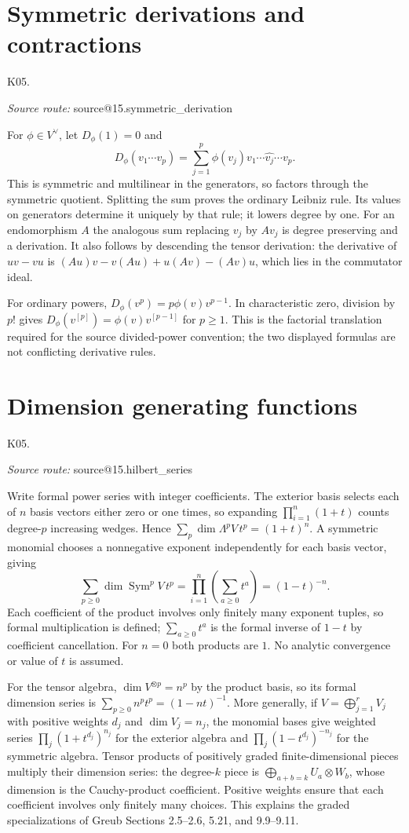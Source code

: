\documentclass[11pt,a4paper]{book}
\makeatletter
\theoremstyle{definition}\newtheorem{definition}[theorem]{Definition}
\theoremstyle{remark}\newtheorem{remark}[theorem]{Remark}
\DeclareMathOperator{\Sym}{Sym}\DeclareMathOperator{\Ann}{Ann}
\newcommand{\Kentry}[2]{\section{#2}\label{k:#1}\noindent\textsf{\small K05.\detokenize{#1}}\par
  \begingroup\small\color{black!65}\textit{Source route: }\csname source@#1\endcsname\par\endgroup}
\makeatother
\begin{document}
\Kentry{15.symmetric_derivation}{Symmetric derivations and contractions}
For $\phi\in V^\vee$, let $D_\phi(1)=0$ and
\[
 D_\phi(v_1\cdots v_p)=\sum_{j=1}^p\phi(v_j)v_1\cdots\widehat{v_j}\cdots v_p.
\]
This is symmetric and multilinear in the generators, so factors through the symmetric quotient. Splitting the sum proves the ordinary Leibniz rule. Its values on generators determine it uniquely by that rule; it lowers degree by one. For an endomorphism $A$ the analogous sum replacing $v_j$ by $Av_j$ is degree preserving and a derivation. It also follows by descending the tensor derivation: the derivative of $uv-vu$ is $(Au)v-v(Au)+u(Av)-(Av)u$, which lies in the commutator ideal.

For ordinary powers, $D_\phi(v^p)=p\phi(v)v^{p-1}$. In characteristic zero, division by $p!$ gives $D_\phi(v^{[p]})=\phi(v)v^{[p-1]}$ for $p\ge1$. This is the factorial translation required for the source divided-power convention; the two displayed formulas are not conflicting derivative rules.

\Kentry{15.hilbert_series}{Dimension generating functions}
Write formal power series with integer coefficients. The exterior basis selects each of $n$ basis vectors either zero or one times, so expanding $\prod_{i=1}^n(1+t)$ counts degree-$p$ increasing wedges. Hence $\sum_p\dim\Lambda^pV\,t^p=(1+t)^n$. A symmetric monomial chooses a nonnegative exponent independently for each basis vector, giving
\[
 \sum_{p\ge0}\dim\Sym^pV\,t^p
 =\prod_{i=1}^n\left(\sum_{a\ge0}t^a\right)=(1-t)^{-n}.
\]
Each coefficient of the product involves only finitely many exponent tuples, so formal multiplication is defined; $\sum_{a\ge0}t^a$ is the formal inverse of $1-t$ by coefficient cancellation. For $n=0$ both products are $1$. No analytic convergence or value of $t$ is assumed.


For the tensor algebra, $\dim V^{\otimes p}=n^p$ by the product basis, so its formal dimension series is $\sum_{p\ge0}n^pt^p=(1-nt)^{-1}$. More generally, if $V=\bigoplus_{j=1}^rV_j$ with positive weights $d_j$ and $\dim V_j=n_j$, the monomial bases give weighted series $\prod_j(1+t^{d_j})^{n_j}$ for the exterior algebra and $\prod_j(1-t^{d_j})^{-n_j}$ for the symmetric algebra. Tensor products of positively graded finite-dimensional pieces multiply their dimension series: the degree-$k$ piece is $\bigoplus_{a+b=k}U_a\otimes W_b$, whose dimension is the Cauchy-product coefficient. Positive weights ensure that each coefficient involves only finitely many choices. This explains the graded specializations of Greub Sections 2.5--2.6, 5.21, and 9.9--9.11.
\end{document}
